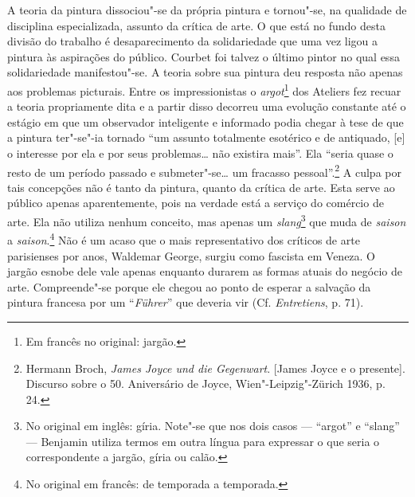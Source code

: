 A teoria da pintura dissociou"-se da própria pintura e tornou"-se, na
qualidade de disciplina especializada, assunto da crítica de arte. O que
está no fundo desta divisão do trabalho é desaparecimento da
solidariedade que uma vez ligou a pintura às aspirações do público.
Courbet foi talvez o último pintor no qual essa solidariedade
manifestou"-se. A teoria sobre sua pintura deu resposta não apenas aos
problemas picturais. Entre os impressionistas o \emph{argot}\footnote{Em francês no original: jargão. \versal{[N. T.]}} dos Ateliers fez recuar a teoria
propriamente dita e a partir disso decorreu uma evolução constante até o
estágio em que um observador inteligente e informado podia chegar à tese
de que a pintura ter"-se"-ia tornado ``um assunto totalmente esotérico e
de antiquado, {[}e{]} o interesse por ela e por seus problemas\ldots{} não
existira mais''. Ela ``seria quase o resto de um período passado e
submeter"-se\ldots{} um fracasso pessoal''.\footnote{Hermann Broch, \emph{James
  Joyce und die Gegenwart}. {[}James Joyce e o presente{]}. Discurso
  sobre o 50. Aniversário de Joyce, Wien"-Leipzig"-Zürich 1936, p. 24.} A
culpa por tais concepções não é tanto da pintura, quanto da crítica de
arte. Esta serve ao público apenas aparentemente, pois na verdade está a
serviço do comércio de arte. Ela não utiliza nenhum conceito, mas apenas
um \emph{slang}\footnote{No original em inglês: gíria. Note"-se que
  nos dois casos --- ``argot'' e ``slang'' --- Benjamin utiliza termos em
  outra língua para expressar o que seria o correspondente a jargão,
  gíria ou calão. \versal{[N. T.]}} que muda de \emph{saison} a \emph{saison}.\footnote{No original em francês: de temporada a temporada. \versal{[N. T.]}} Não é um acaso que
o mais representativo dos críticos de arte parisienses por anos,
Waldemar George, surgiu como fascista em Veneza. O jargão esnobe dele
vale apenas enquanto durarem as formas atuais do negócio de arte.
Compreende"-se porque ele chegou ao ponto de esperar a salvação da
pintura francesa por um ``\emph{Führer}'' que deveria vir (Cf.
\emph{Entretiens}, p. 71).

